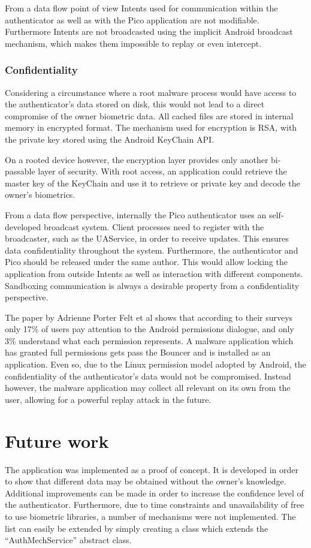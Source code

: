 From a data flow point of view Intents used for communication within the authenticator as well as with the Pico application are not modifiable. Furthermore Intents are not broadcasted using the implicit Android broadcast mechanism, which makes them impossible to replay or even intercept.

\subsubsection*{Confidentiality}
Considering a circumstance where a root malware process would have access to the authenticator's data stored on disk, this would not lead to a direct compromise of the owner biometric data. All cached files are stored in internal memory in encrypted format. The mechanism used for encryption is RSA, with the private key stored using the Android KeyChain API.

On a rooted device however, the encryption layer provides only another bi-passable layer of security. With root access, an application could retrieve the master key of the KeyChain and use it to retrieve or private key and decode the owner's biometrics.

From a data flow perspective, internally the Pico authenticator uses an self-developed broadcast system. Client processes need to register with the broadcaster, such as the UAService, in order to receive updates. This ensures data confidentiality throughout the system. Furthermore, the authenticator and Pico should be released under the same author. This would allow locking the application from outside Intents as well as interaction with different components. Sandboxing communication is always a desirable property from a confidentiality perspective.

The paper by Adrienne Porter Felt et al \cite{felt2012android} shows that according to their surveys only 17\% of users pay attention to the Android permissions dialogue, and only 3\% understand what each permission represents. A malware application which has granted full permissions gets pass the Bouncer and is installed as an application. Even so, due to the Linux permission model adopted by Android, the confidentiality of the authenticator's data would not be compromised. Instead however, the malware application may collect all relevant on its own from the user, allowing for a powerful replay attack in the future.

\section{Future work}
The application was implemented as a proof of concept. It is developed in order to show that different data may be obtained without the owner's knowledge. Additional improvements can be made in order to increase the confidence level of the authenticator.  Furthermore, due to time constraints and unavailability of free to use biometric libraries, a number of mechanisms were not implemented. The list can easily be extended by simply creating a class which extends the ``AuthMechService'' abstract class.

